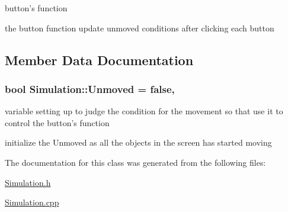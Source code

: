 button's function 

the button function update unmoved conditions after clicking each button 

\subsection{Member Data Documentation}
\hypertarget{classSimulation_a738b72757500bc1c1fb33ffa42053c71}{
\subsubsection[{Unmoved}]{\setlength{\rightskip}{0pt plus 5cm}bool Simulation\-::\-Unmoved = false\hspace{0.3cm}{\ttfamily [static]}, {\ttfamily [protected]}}}\label{classSimulation_a738b72757500bc1c1fb33ffa42053c71}


variable setting up to judge the condition for the movement so that use it to control the button's function 

initialize the Unmoved as all the objects in the screen has started moving 

The documentation for this class was generated from the following files\-:\begin{DoxyCompactItemize}
\item 
\hyperlink{Simulation_8h}{Simulation.\-h}\item 
\hyperlink{Simulation_8cpp}{Simulation.\-cpp}\end{DoxyCompactItemize}
